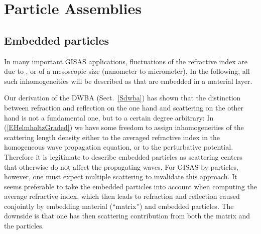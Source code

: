 

\chapter{Particle Assemblies}  \label{sec:Assemblies}


\section{Embedded particles}

%
%
%
In many important GISAS applications,
fluctuations of the refractive index are due to
,  or 
%
%
%
of a mesoscopic size (nanometer to micrometer).
In the following, all such inhomogeneities will be described as
 that are embedded in a material layer.

Our derivation of the DWBA (Sect.~\ref{Sdwba}) has shown
that the distinction between refraction and reflection on the one hand
and scattering on the other hand is not a fundamental one,
but to a certain degree arbitrary:
In (\ref{EHelmholtzGraded}) we have some freedom to assign
inhomogeneities of the scattering length density
either to the averaged refractive index in the
homogeneous wave propagation equation,
or to the perturbative potential.
Therefore it is legitimate
to describe  embedded particles
as scattering centers that otherwise do not affect the propagating waves.
For GISAS by  particles, however,
one must expect multiple scattering to invalidate this approach.
It seems preferable to take the embedded particles into account
when computing the average refractive index,
which then leads to refraction and reflection caused conjointly
by embedding material (``matrix'') and embedded particles.
%
The downside is that one has then scattering contribution
from both the matrix and the particles.

